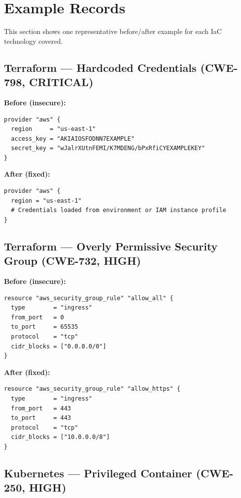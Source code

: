 \documentclass[11pt,a4paper]{article}
\begin{document}
\section{Example Records}

This section shows one representative before/after example for each IaC technology covered.

\subsection{Terraform --- Hardcoded Credentials (CWE-798, CRITICAL)}

\textbf{Before (insecure):}
\begin{lstlisting}[style=iac]
provider "aws" {
  region     = "us-east-1"
  access_key = "AKIAIOSFODNN7EXAMPLE"
  secret_key = "wJalrXUtnFEMI/K7MDENG/bPxRfiCYEXAMPLEKEY"
}
\end{lstlisting}

\textbf{After (fixed):}
\begin{lstlisting}[style=iac]
provider "aws" {
  region = "us-east-1"
  # Credentials loaded from environment or IAM instance profile
}
\end{lstlisting}

\subsection{Terraform --- Overly Permissive Security Group (CWE-732, HIGH)}

\textbf{Before (insecure):}
\begin{lstlisting}[style=iac]
resource "aws_security_group_rule" "allow_all" {
  type        = "ingress"
  from_port   = 0
  to_port     = 65535
  protocol    = "tcp"
  cidr_blocks = ["0.0.0.0/0"]
}
\end{lstlisting}

\textbf{After (fixed):}
\begin{lstlisting}[style=iac]
resource "aws_security_group_rule" "allow_https" {
  type        = "ingress"
  from_port   = 443
  to_port     = 443
  protocol    = "tcp"
  cidr_blocks = ["10.0.0.0/8"]
}
\end{lstlisting}

\subsection{Kubernetes --- Privileged Container (CWE-250, HIGH)}
\end{document}
